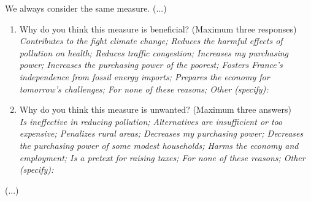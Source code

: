\documentclass[english,5p,authoryear]{elsarticle}
\begin{document}
\begin{appendices}
We always consider the same measure. (...)
\begin{enumerate}[resume,leftmargin=*]
\item Why do you think this measure is beneficial? (Maximum three responses)
\emph{}\\
\emph{Contributes to the fight climate change; Reduces the harmful
effects of pollution on health; Reduces traffic congestion; Increases
my purchasing power; Increases the purchasing power of the poorest;
Fosters France's independence from fossil energy imports; Prepares
the economy for tomorrow's challenges; For none of these reasons;
Other (specify): }
\item Why do you think this measure is unwanted? (Maximum three answers)
\emph{}\\
\emph{Is ineffective in reducing pollution; Alternatives are insufficient
or too expensive; Penalizes rural areas; Decreases my purchasing power;
Decreases the purchasing power of some modest households; Harms the
economy and employment; Is a pretext for raising taxes; For none of
these reasons; Other (specify):} 
\end{enumerate}
(...)


\end{appendices}
\end{document}
